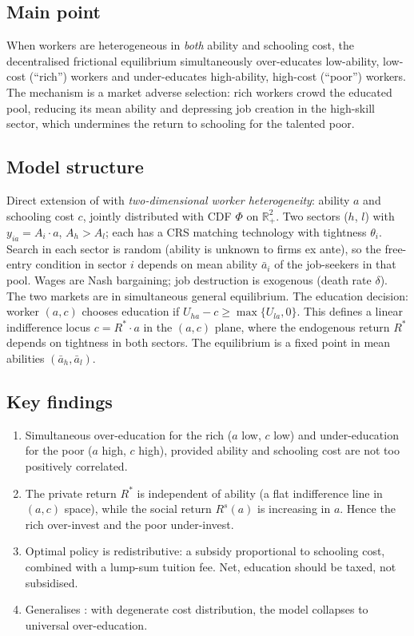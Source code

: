 \documentclass[12pt]{article}
\begin{document}
\subsection*{Main point}

When workers are heterogeneous in \emph{both} ability and schooling cost, the decentralised frictional equilibrium simultaneously over-educates low-ability, low-cost (``rich'') workers and under-educates high-ability, high-cost (``poor'') workers. The mechanism is a market adverse selection: rich workers crowd the educated pool, reducing its mean ability and depressing job creation in the high-skill sector, which undermines the return to schooling for the talented poor.

\subsection*{Model structure}

Direct extension of \citet{charlot2005} with \emph{two-dimensional worker heterogeneity}: ability $a$ and schooling cost $c$, jointly distributed with CDF $\Phi$ on $\mathbb{R}_+^2$. Two sectors ($h$, $l$) with $y_{ia} = A_i \cdot a$, $A_h > A_l$; each has a CRS matching technology with tightness $\theta_i$. Search in each sector is random (ability is unknown to firms ex ante), so the free-entry condition in sector $i$ depends on mean ability $\bar{a}_i$ of the job-seekers in that pool. Wages are Nash bargaining; job destruction is exogenous (death rate $\delta$). The two markets are in simultaneous general equilibrium. The education decision: worker $(a,c)$ chooses education if $U_{ha} - c \geq \max\{U_{la}, 0\}$. This defines a linear indifference locus $c = R^* \cdot a$ in the $(a,c)$ plane, where the endogenous return $R^*$ depends on tightness in both sectors. The equilibrium is a fixed point in mean abilities $(\bar{a}_h, \bar{a}_l)$.

\subsection*{Key findings}

\begin{enumerate}
    \item Simultaneous over-education for the rich ($a$ low, $c$ low) and under-education for the poor ($a$ high, $c$ high), provided ability and schooling cost are not too positively correlated.
    \item The private return $R^*$ is independent of ability (a flat indifference line in $(a,c)$ space), while the social return $R^s(a)$ is increasing in $a$. Hence the rich over-invest and the poor under-invest.
    \item Optimal policy is redistributive: a subsidy proportional to schooling cost, combined with a lump-sum tuition fee. Net, education should be taxed, not subsidised.
    \item Generalises \citet{charlot2005}: with degenerate cost distribution, the model collapses to universal over-education.
\end{enumerate}
\end{document}
